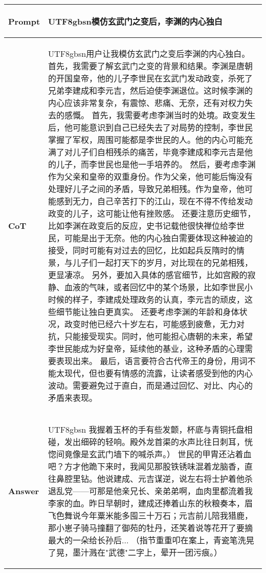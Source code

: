 \begin{table}
\centering
\begin{tabular}{>{\centering\arraybackslash}p{1.2cm}|p{14.5cm}}
\toprule
\textbf{Prompt} & \begin{CJK*}{UTF8}{gbsn}模仿玄武门之变后，李渊的内心独白\end{CJK*} \\
\midrule
\textbf{CoT} & \begin{CJK*}{UTF8}{gbsn}用户让我模仿玄武门之变后李渊的内心独白。首先，我需要了解玄武门之变的背景和结果。李渊是唐朝的开国皇帝，他的儿子李世民在玄武门发动政变，杀死了兄弟李建成和李元吉，然后迫使李渊退位。这时候李渊的内心应该非常复杂，有震惊、悲痛、无奈，还有对权力失去的感慨。
首先，我需要考虑李渊当时的处境。政变发生后，他可能意识到自己已经失去了对局势的控制，李世民掌握了军权，周围可能都是李世民的人。他的内心可能充满了对儿子们自相残杀的痛苦，毕竟李建成和李元吉是他的儿子，而李世民也是他一手培养的。
然后，要考虑李渊作为父亲和皇帝的双重身份。作为父亲，他可能后悔没有处理好儿子之间的矛盾，导致兄弟相残。作为皇帝，他可能感到无力，自己辛苦打下的江山，现在不得不传给发动政变的儿子，这可能让他有挫败感。
还要注意历史细节，比如李渊在政变后的反应，史书记载他很快禅位给李世民，可能是出于无奈。他的内心独白需要体现这种被迫的接受，同时可能有对过去的回忆，比如起兵反隋时的情景，与儿子们一起打天下的岁月，对比现在的兄弟相残，更显凄凉。
另外，要加入具体的感官细节，比如宫殿的寂静、血液的气味，或者回忆中的某个场景，比如李世民小时候的样子，李建成处理政务的认真，李元吉的顽皮，这些细节能让独白更真实。
还要考虑李渊的年龄和身体状况，政变时他已经六十岁左右，可能感到疲惫，无力对抗，只能接受现实。同时，他可能担心唐朝的未来，希望李世民能成为好皇帝，延续他的基业，这种矛盾的心理需要表现出来。
最后，语言要符合古代帝王的身份，用词不能太现代，但也要有情感的流露，让读者感受到他的内心波动。需要避免过于直白，而是通过回忆、对比、内心的矛盾来表现。\end{CJK*} \\
\midrule
\textbf{Answer} & \begin{CJK*}{UTF8}{gbsn}
我握着玉杯的手有些发颤，杯底与青铜托盘相碰，发出细碎的轻响。殿外龙首渠的水声比往日刺耳，恍惚间竟像是玄武门墙下的喊杀声。）
世民的甲胄还沾着血吧？方才他跪下来时，我闻见那股铁锈味混着龙脑香，直往鼻腔里钻。他说建成、元吉谋逆，说左右将士护着他杀退乱党——可那是他亲兄长、亲弟弟啊，血肉里都流着我李家的血。昨日早朝时，建成还捧着山东的秋粮奏本，眉飞色舞说今年粟米能多囤三十万石；元吉前儿陪我猎鹿，那小崽子骑马撞翻了御苑的牡丹，还笑着说等花开了要摘最大的一朵给长孙后...
（指节重重叩在案上，青瓷笔洗晃了晃，墨汁溅在"武德"二字上，晕开一团污痕。）

\end{CJK*}
\end{tabular}
\end{table}
